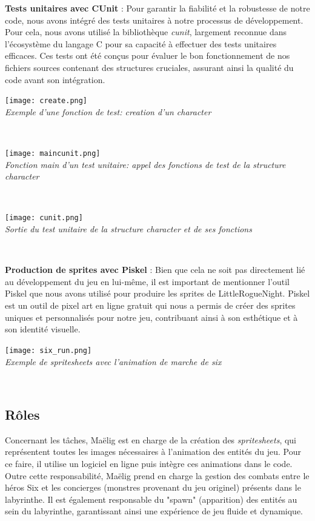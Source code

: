 \documentclass[10pt]{article}
\begin{document}
\begin{center}

\textbf{Tests unitaires avec CUnit} :
Pour garantir la fiabilité et la robustesse de notre code, nous avons intégré des tests unitaires à notre processus de développement. Pour cela, nous avons utilisé la bibliothèque \textit{\gls{cunit}}, largement reconnue dans l'écosystème du langage C pour sa capacité à effectuer des tests unitaires efficaces. Ces tests ont été conçus pour évaluer le bon fonctionnement de nos fichiers sources contenant des structures cruciales, assurant ainsi la qualité du code avant son intégration. 
\begin{center}
\texttt{[image: create.png]}\\
\caption{{\emph{Exemple d'une fonction de test: creation d'un character}}}
\label{fig6}\\
\end{center}
\begin{center}
\texttt{[image: maincunit.png]}\\
\caption{{\emph{Fonction main d'un test unitaire: appel des fonctions de test de la structure character}}}
\label{fig7}\\
\end{center}
\begin{center}
\texttt{[image: cunit.png]}\\
\caption{{\emph{Sortie du test unitaire de la structure character et de ses fonctions}}}
\label{fig5}\\
\end{center}

\textbf{Production de sprites avec Piskel} :
Bien que cela ne soit pas directement lié au développement du jeu en lui-même, il est important de mentionner l'outil Piskel que nous avons utilisé pour produire les sprites de LittleRogueNight. Piskel est un outil de pixel art en ligne gratuit qui nous a permis de créer des sprites uniques et personnalisés pour notre jeu, contribuant ainsi à son esthétique et à son identité visuelle.\\
\begin{center}
\texttt{[image: six\_run.png]}\\
\caption{{\emph{Exemple de spritesheets avec l'animation de marche de six}}}
\label{fig4}\\
\end{center}

\subsection{Rôles}
Concernant les tâches, Maëlig est en charge de la création des \textit{\gls{spritesheets}}, qui représentent toutes les images nécessaires à l'animation des entités du jeu. Pour ce faire, il utilise un logiciel en ligne puis intègre ces animations dans le code. Outre cette responsabilité, Maëlig prend en charge la gestion des combats entre le héros Six et les concierges (monstres provenant du jeu originel) présents dans le labyrinthe. Il est également responsable du "spawn" (apparition) des entités au sein du labyrinthe, garantissant ainsi une expérience de jeu fluide et dynamique.


\end{center}
\end{document}
